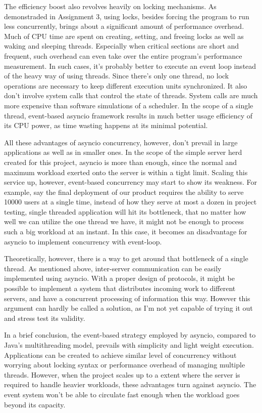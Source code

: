 \documentclass[letterpaper,twocolumn,10pt]{article}
\begin{document}
The efficiency boost also revolves heavily on locking mechanisms. 
As demonstraded in Assignment 3, using locks, besides forcing the program to run less concurrently, brings about a significant amount of performance overhead.
Much of CPU time are spent on creating, setting, and freeing locks as well as waking and sleeping threads. 
Especially when critical sections are short and frequent, such overhead can even take over the entire program's performance measurement.
In such cases, it's probably better to execute an event loop instead of the heavy way of using threads. 
Since there's only one thread, no lock operations are necessary to keep different execution units synchronized. 
It also don't involve system calls that control the state of threads.
System calls are much more expensive than software simulations of a scheduler.
In the scope of a single thread, event-based asyncio framework results in much better usage efficiency of its CPU power, as time wasting happens at its minimal potential.

All these advantages of asyncio concurrency, however, don't prevail in large applications as well as in smaller ones.
In the scope of the simple server herd created for this project, asyncio is more than enough, since the normal and maximum workload exerted onto the server is within a tight limit.
Scaling this service up, however, event-based concurrency may start to show its weakness.
For example, say the final deployment of our product requires the ability to serve 10000 users at a single time, instead of how they serve at most a dozen in project testing, single threaded application will hit its bottleneck, that no matter how well we can utilize the one thread we have, it might not be enough to process such a big workload at an instant.
In this case, it becomes an disadvantage for asyncio to implement concurrency with event-loop.

Theoretically, however, there is a way to get around that bottleneck of a single thread.
As mentioned above, inter-server communication can be easily implemented using asyncio.
With a proper design of protocols, it might be possible to implement a system that distributes incoming work to different servers, and have a concurrent processing of information this way.
However this argument can hardly be called a solution, as I'm not yet capable of trying it out and stress test its validity.

In a brief conclusion, the event-based strategy employed by asyncio, compared to Java's multithreading model, prevails with simplicity and light weight execution.
Applications can be created to achieve similar level of concurrency without worrying about locking syntax or performance overhead of managing multiple threads.
However, when the project scales up to a extent where the server is required to handle heavier workloads, these advantages turn against asyncio. 
The event system won't be able to circulate fast enough when the workload goes beyond its capacity.
\end{document}
